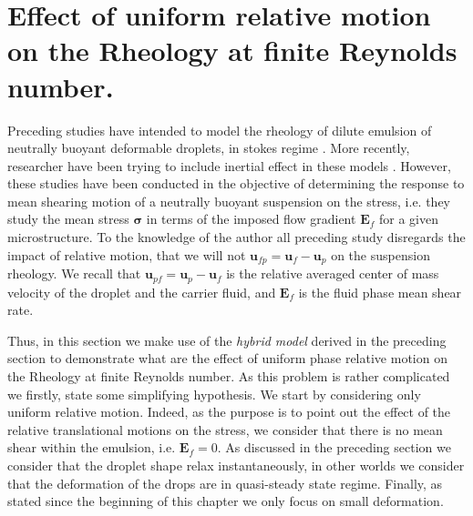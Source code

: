 \section{
    Effect of uniform relative motion on the Rheology at finite Reynolds number. 
    }
\label{sec:particle_def}














Preceding studies have intended to model the rheology of dilute emulsion of neutrally buoyant deformable droplets, in stokes regime \citep{goddard1967nonlinear,lhuillier1987phenomenology,maffettone1998equation}.
More recently, researcher have been trying to include inertial effect in these models \citet{raja2010inertial,mwasame2018macroscopic}. 
However, these studies have been conducted in the objective of determining the response to mean shearing motion of a neutrally buoyant suspension on the stress, i.e. they study the mean stress $\bm{\sigma}$ in terms of the imposed flow gradient $\textbf{E}_f$ for a given microstructure. 
To the knowledge of the author all preceding study disregards the impact of relative motion, that we will not $\textbf{u}_{fp} = \textbf{u}_f - \textbf{u}_p$ on the suspension rheology.
We recall that $\textbf{u}_{p f} = \textbf{u}_p  - \textbf{u}_f$ is the relative averaged center of mass velocity of the droplet and the carrier fluid,  and $\textbf{E}_f$ is the fluid phase mean shear rate. 


Thus, in this section we make use of the \textit{hybrid model} derived in the preceding section to demonstrate what are the effect of uniform phase relative motion on the Rheology at finite Reynolds number. 
As this problem is rather complicated we firstly, state some simplifying hypothesis. 
We start by considering only uniform relative motion. 
Indeed, as the purpose is to point out the effect of the relative translational motions on the stress, we consider that there is no mean shear within the emulsion, i.e. $\textbf{E}_f = 0$. 
As discussed in the preceding section we consider that the droplet shape relax instantaneously, in other worlds we consider that the deformation of the drops are in quasi-steady state regime. 
Finally, as stated since the beginning of this chapter we only focus on small deformation.  



